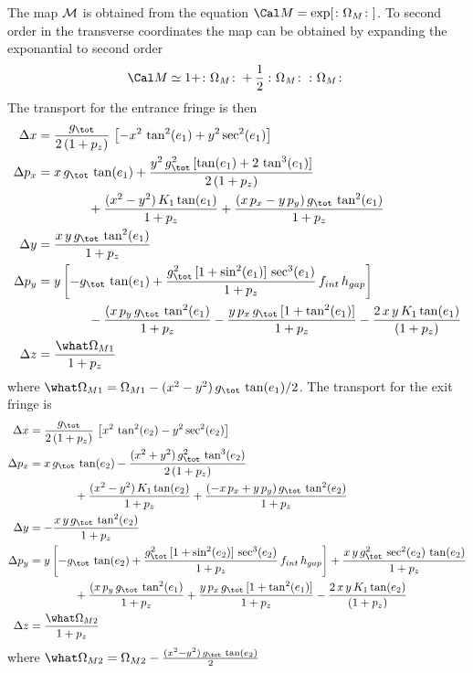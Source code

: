 The map $\cal M$ is obtained from the equation $\Cal M = \exp[\colon\Omega_M\colon]$. To second order in the
transverse coordinates the map can be obtained by expanding the exponantial to second order
\begin{equation}
  \Cal M \simeq 1 + \colon\Omega_M\colon + \frac{1}{2} \, \colon\Omega_M\colon \, \colon\Omega_M\colon
\end{equation}
The transport for the entrance fringe is then
\begin{align}
  \Delta x &= \frac{g_\tot}{2 \, (1 + p_z)} \, \left[ -x^2 \, \tan^2 (e_1) + y^2 \sec^2 (e_1) \right] \CRNO
  \Delta p_x &= x \, g_\tot \, \tan (e_1)
    + \frac{y^2 \, g_\tot^2 \, [ \tan (e_1) + 2 \, \tan^3 (e_1) ]}{2 \, (1 + p_z)} \CRNO
    &\qquad\qquad + \frac{(x^2 - y^2) \, K_1 \tan (e_1)}{1 + p_z}
    + \frac{(x \, p_x - y \, p_y) \, g_\tot \, \tan^2 (e_1)}{1 + p_z} \CRNO
  \Delta y &= \frac{x \, y \, g_\tot \, \tan^2 (e_1)}{1 + p_z} \\
  \Delta p_y &= y \left[ -g_\tot \, \tan (e_1)
    + \frac{g^2_\tot \, [1 + \sin^2 (e_1)] \, \sec^3 (e_1)}{1 + p_z} \, f_{int} \,  h_{gap} \right] \CRNO
    &\qquad\qquad - \frac{(x \, p_y \, g_\tot \, \tan^2 (e_1)}{1 + p_z} 
    - \frac{y \, p_x \, g_\tot \, [1 + \tan^2 (e_1)]}{1 + p_z} 
    - \frac{2 \, x \, y \, K_1 \tan (e_1)}{(1 + p_z)} \CRNO
  \Delta z &= \frac{\what \Omega_{M1}}{1 + p_z} \nonumber
\end{align}
where $\what \Omega_{M1} = \Omega_{M1} - (x^2 - y^2) \, g_\tot \, \tan (e_1)/2$.
The transport for the exit fringe is
\begin{align}
  \Delta x &= \frac{g_\tot}{2 \, (1 + p_z)} \, \left[ x^2 \, \tan^2 (e_2) - y^2 \sec^2 (e_2) \right] \CRNO
  \Delta p_x &= x \, g_\tot \, \tan (e_2)
    - \frac{(x^2 + y^2) \, g_\tot^2 \, \tan^3 (e_2)}{2 \, (1 + p_z)} \CRNO
    &\qquad\qquad + \frac{(x^2 - y^2) \, K_1 \tan (e_2)}{1 + p_z}
    + \frac{(-x \, p_x + y \, p_y) \, g_\tot \, \tan^2 (e_2)}{1 + p_z} \CRNO
  \Delta y &= -\frac{x \, y \, g_\tot \, \tan^2 (e_2)}{1 + p_z} \\
  \Delta p_y &= y \left[ -g_\tot \, \tan (e_2)
    + \frac{g^2_\tot \, [1 + \sin^2 (e_2)] \, \sec^3 (e_2)}{1 + p_z} \, f_{int} \,  h_{gap} \right]
    + \frac{x \, y \, g^2_\tot \, \sec^2 (e_2) \, \tan (e_2)}{1 + p_z} \CRNO
    &\qquad\qquad + \frac{(x \, p_y \, g_\tot \, \tan^2 (e_1)}{1 + p_z} 
    + \frac{y \, p_x \, g_\tot \, [1 + \tan^2 (e_1)]}{1 + p_z} 
    - \frac{2 \, x \, y \, K_1 \tan (e_2)}{(1 + p_z)} \CRNO
  \Delta z &= \frac{\what \Omega_{M2}}{1 + p_z} \nonumber
\end{align}
where $\what \Omega_{M2} = \Omega_{M2} - \frac{(x^2 - y^2) \, g_\tot \, \tan (e_2)}{2}$

